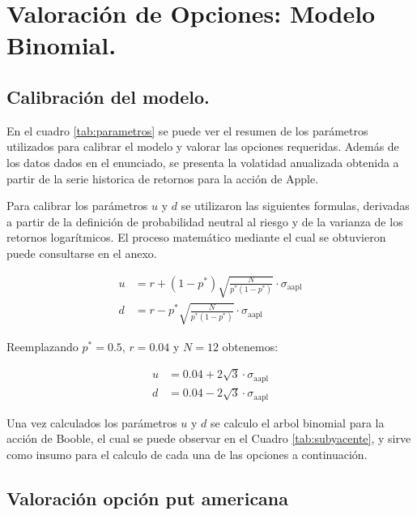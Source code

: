 \documentclass{article}
\theoremstyle{remark}
\theoremstyle{definition}
\begin{document}
 
               
        \newpage

    \section{Valoraci\'on de Opciones: Modelo Binomial.}

    \subsection{Calibraci\'on del modelo.}

    En el cuadro \ref{tab:parametros} se puede ver el resumen de los par\'ametros utilizados para calibrar el modelo y valorar las opciones requeridas. Adem\'as de los datos dados en el enunciado, se presenta la volatidad anualizada obtenida a partir de la serie historica de retornos para la acci\'on de Apple.


    

    Para calibrar los par\'ametros $u$ y $d$ se utilizaron las siguientes formulas, derivadas a partir de la definici\'on de probabilidad neutral al riesgo y de la varianza de los retornos logar\'itmicos. El proceso matem\'atico mediante el cual se obtuvieron puede consultarse en el anexo.

    \begin{align}
        u &= r + \left({1-p^{*}}\right)\sqrt{\frac{N}{p^{*}\left(1-p^{*}\right)}}\cdot\sigma_{\text{aapl}} \\
        d &=r- p^{*}\sqrt{\frac{N}{p^{*}\left(1-p^{*}\right)}}\cdot\sigma_{\text{aapl}}
    \end{align}

    Reemplazando $p^{*}= 0.5$, $r= 0.04$ y $N = 12$ obtenemos:

    \begin{align}
        u &= 0.04 + 2\sqrt{3}\cdot\sigma_{\text{aapl}} \\
        d &= 0.04 - 2\sqrt{3}\cdot\sigma_{\text{aapl}} 
    \end{align}

    Una vez calculados los par\'ametros $u$ y $d$ se calculo el arbol binomial para la acci\'on de Booble, el cual se puede observar en el Cuadro \ref{tab:subyacente}, y sirve como insumo para el calculo de cada una de las opciones a continuaci\'on.

    
    
    \subsection{Valoraci\'on opci\'on put americana}
\end{document}
